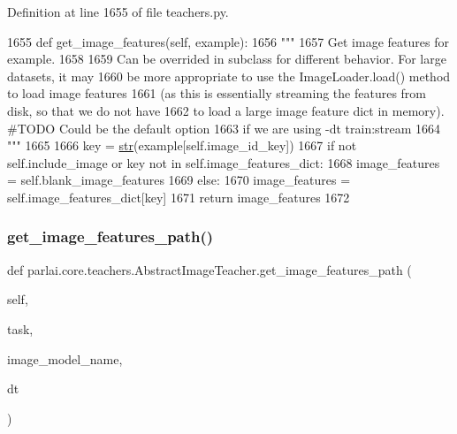 Definition at line 1655 of file teachers.\+py.


\begin{DoxyCode}
1655     \textcolor{keyword}{def }get\_image\_features(self, example):
1656         \textcolor{stringliteral}{"""}
1657 \textcolor{stringliteral}{        Get image features for example.}
1658 \textcolor{stringliteral}{}
1659 \textcolor{stringliteral}{        Can be overrided in subclass for different behavior. For large datasets, it may}
1660 \textcolor{stringliteral}{        be more appropriate to use the ImageLoader.load() method to load image features}
1661 \textcolor{stringliteral}{        (as this is essentially streaming the features from disk, so that we do not have}
1662 \textcolor{stringliteral}{        to load a large image feature dict in memory). #TODO Could be the default option}
1663 \textcolor{stringliteral}{        if we are using -dt train:stream}
1664 \textcolor{stringliteral}{        """}
1665 
1666         key = \hyperlink{namespacegenerate__task__READMEs_a5b88452ffb87b78c8c85ececebafc09f}{str}(example[self.image\_id\_key])
1667         \textcolor{keywordflow}{if} \textcolor{keywordflow}{not} self.include\_image \textcolor{keywordflow}{or} key \textcolor{keywordflow}{not} \textcolor{keywordflow}{in} self.image\_features\_dict:
1668             image\_features = self.blank\_image\_features
1669         \textcolor{keywordflow}{else}:
1670             image\_features = self.image\_features\_dict[key]
1671         \textcolor{keywordflow}{return} image\_features
1672 
\end{DoxyCode}
\mbox{\label{classparlai_1_1core_1_1teachers_1_1AbstractImageTeacher_a29fce019ea9795947235ba208aa4bfb0}} 
\subsubsection{\texorpdfstring{get\+\_\+image\+\_\+features\+\_\+path()}{get\_image\_features\_path()}}
{\footnotesize\ttfamily def parlai.\+core.\+teachers.\+Abstract\+Image\+Teacher.\+get\+\_\+image\+\_\+features\+\_\+path (\begin{DoxyParamCaption}\item[{}]{self,  }\item[{}]{task,  }\item[{}]{image\+\_\+model\+\_\+name,  }\item[{}]{dt }\end{DoxyParamCaption})}

